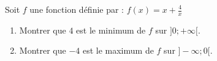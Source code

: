 \begin{Application}[][10 min]
Soit $f$ une fonction définie par : \quad $f(x) = x + \frac{4}{x}$
\begin{enumerate}
    \item Montrer que $4$ est le minimum de $f$ sur $]0 ; +\infty[$.
    \item Montrer que $-4$ est le maximum de $f$ sur $]-\infty ; 0[$.
\end{enumerate}
\end{Application}
